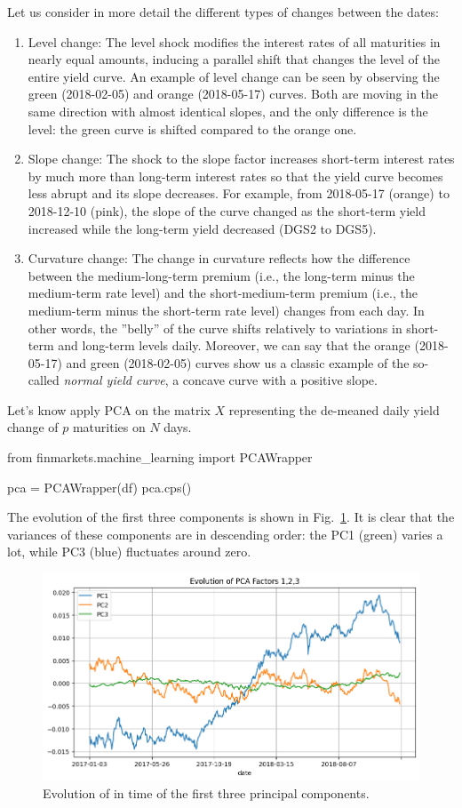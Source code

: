 \begin{enumerate}
Let us consider in more detail the different types of changes between the dates:
\begin{enumerate}
\item Level change: The level shock modifies the interest rates of all maturities in nearly equal amounts, inducing a parallel shift that changes the level of the entire yield curve. An example of level change can be seen by observing the green (2018-02-05) and orange (2018-05-17) curves. Both are moving in the same direction with almost identical slopes, and the only difference is the level: the green curve is shifted compared to the orange one.
\item Slope change: The shock to the slope factor increases short-term interest rates by much more than long-term interest rates so that the yield curve becomes less abrupt and its slope decreases.
For example, from 2018-05-17 (orange) to 2018-12-10 (pink), the slope of the curve changed as the short-term yield increased while the long-term yield decreased (DGS2 to DGS5).
\item Curvature change: The change in curvature reflects how the difference between the medium-long-term premium (i.e., the long-term minus the medium-term rate level) and the short-medium-term premium (i.e., the medium-term minus the short-term rate level) changes from each day. In other words, the ”belly” of the curve shifts relatively to variations in short-term and long-term levels daily. Moreover, we can say that the orange (2018-05-17) and green (2018-02-05) curves show us a classic example of the so-called \emph{normal yield curve}, a concave curve with a positive slope.
\end{enumerate}

Let's know apply PCA on the matrix $X$ representing the de-meaned daily yield change of $p$ maturities on $N$ days.

\begin{ipython}
from finmarkets.machine_learning import PCAWrapper

pca = PCAWrapper(df)
pca.cps()
\end{ipython}

The evolution of the first three components is shown in Fig.~\ref{fig:pca_evolution_components}. It is clear that the variances of these components are in descending order: the PC1 (green) varies a lot, while PC3 (blue) fluctuates around zero.

\begin{figure}[hbtp]
	\centering
	\includegraphics[width=0.7\linewidth]{figures/pca_evolution_components}
	\caption{Evolution of in time of the first three principal components.}
	\label{fig:pca_evolution_components}
\end{figure}


\end{enumerate}
